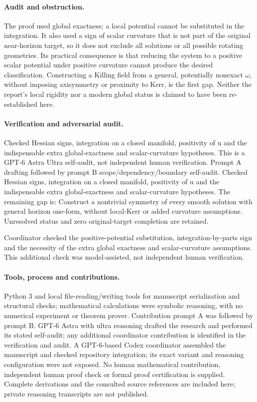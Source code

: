 \documentclass[11pt]{article}
\begin{document}
\paragraph{Audit and obstruction.} The proof used global exactness; a local potential cannot be substituted in the integration. It also used a sign of scalar curvature that is not part of the original near-horizon target, so it does not exclude all solutions or all possible rotating geometries. Its practical consequence is that reducing the system to a positive scalar potential under positive curvature cannot produce the desired classification. Constructing a Killing field from a general, potentially nonexact \(\omega\), without imposing axisymmetry or proximity to Kerr, is the first gap. Neither the report's local rigidity nor a modern global status is claimed to have been re-established here.

\paragraph{Verification and adversarial audit.}
Checked Hessian signs, integration on a closed manifold, positivity of u and the indispensable extra global-exactness and scalar-curvature hypotheses. This is a GPT-6 Astra Ultra self-audit, not independent human verification. Prompt A drafting followed by prompt B scope/dependency/boundary self-audit. Checked Hessian signs, integration on a closed manifold, positivity of u and the indispensable extra global-exactness and scalar-curvature hypotheses. The remaining gap is: Construct a nontrivial symmetry of every smooth solution with general horizon one-form, without local-Kerr or added curvature assumptions. Unresolved status and zero original-target completion are retained.

Coordinator checked the positive-potential substitution, integration-by-parts sign and the necessity of the extra global exactness and scalar-curvature assumptions. This additional check was model-assisted, not independent human verification.

\paragraph{Tools, process and contributions.}
Python 3 and local file-reading/writing tools for manuscript serialization and structural checks; mathematical calculations were symbolic reasoning, with no numerical experiment or theorem prover. Contribution prompt A was followed by prompt B. GPT-6 Astra with ultra reasoning drafted the research and performed its stated self-audit; any additional coordinator contribution is identified in the verification and audit. A GPT-6-based Codex coordinator assembled the manuscript and checked repository integration; its exact variant and reasoning configuration were not exposed. No human mathematical contribution, independent human proof check or formal proof certification is supplied. Complete derivations and the consulted source references are included here; private reasoning transcripts are not published.
\end{document}
